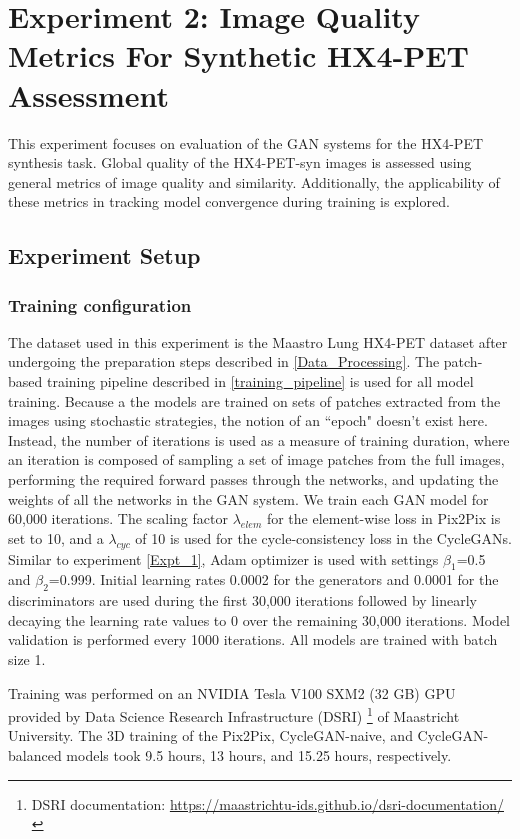\section{Experiment 2: Image Quality Metrics For Synthetic HX4-PET Assessment}
\label{Expt_2}
This experiment focuses on evaluation of the GAN systems for the HX4-PET synthesis task. Global quality of the HX4-PET-syn images is assessed using general metrics of image quality and similarity. Additionally, the applicability of these metrics in tracking model convergence during training is explored.


\subsection{Experiment Setup}

\subsubsection{Training configuration}
The dataset used in this experiment is the Maastro Lung HX4-PET dataset after undergoing the preparation steps described in \ref{Data_Processing}. The patch-based training pipeline described in \ref{training_pipeline} is used for all model training. Because a the models are trained on sets of patches extracted from the images using stochastic strategies, the notion of an ``epoch" doesn't exist here. Instead, the number of iterations is used as a measure of training duration, where an iteration is composed of sampling a set of image patches from the full images, performing the required forward passes through the networks, and updating the weights of all the networks in the GAN system. We train each GAN model for 60,000 iterations. The scaling factor $\lambda_{elem}$ for the element-wise loss in Pix2Pix is set to 10, and a $\lambda_{cyc}$ of 10 is used for the cycle-consistency loss in the CycleGANs. Similar to experiment \ref{Expt_1}, Adam optimizer is used with settings $\beta_1$=0.5 and $\beta_2$=0.999. Initial learning rates 0.0002 for the generators and 0.0001 for the discriminators are used during the first 30,000 iterations followed by linearly decaying the learning rate values to 0 over the remaining 30,000 iterations. Model validation is performed every 1000 iterations. All models are trained with batch size 1.

Training was performed on an NVIDIA Tesla V100 SXM2 (32 GB) GPU provided by Data Science Research Infrastructure (DSRI) \footnote{DSRI documentation: \url{https://maastrichtu-ids.github.io/dsri-documentation/}} of Maastricht University. The 3D training of the Pix2Pix, CycleGAN-naive, and CycleGAN-balanced models took 9.5 hours, 13 hours, and 15.25 hours, respectively. 


